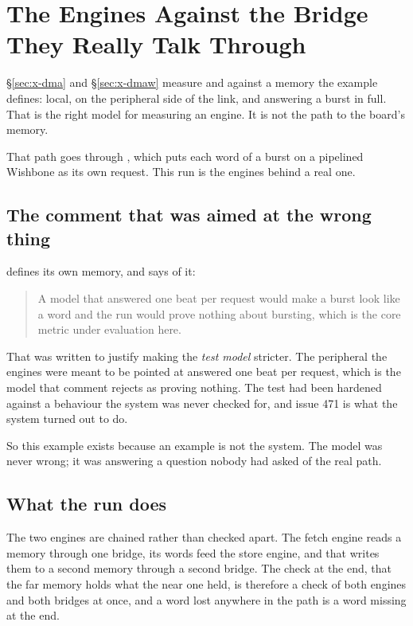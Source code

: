 \section{The Engines Against the Bridge They Really Talk Through}
\label{sec:x-dmawb}

\S\ref{sec:x-dma} and \S\ref{sec:x-dmaw} measure  and
 against a memory the example defines: local, on the
peripheral side of the link, and answering a burst in full. That is
the right model for measuring an engine. It is not the path to the
board's memory.

That path goes through , which puts each word of a burst
on a pipelined Wishbone as its own request. This run is the engines
behind a real one.

\subsection{The comment that was aimed at the wrong thing}

 defines its own memory, and says of it:

\begin{quote}
A model that answered one beat per request would make a burst look
like a word and the run would prove nothing about bursting, which is
the core metric under evaluation here.
\end{quote}

That was written to justify making the \emph{test model} stricter.
The peripheral the engines were meant to be pointed at answered one
beat per request, which is the model that comment rejects as proving
nothing. The test had been hardened against a behaviour the system
was never checked for, and issue 471 is what the system turned out to
do.

So this example exists because an example is not the system. The
model was never wrong; it was answering a question nobody had asked
of the real path.

\subsection{What the run does}

The two engines are chained rather than checked apart. The fetch
engine reads a memory through one bridge, its words feed the store
engine, and that writes them to a second memory through a second
bridge. The check at the end, that the far memory holds what the near
one held, is therefore a check of both engines and both bridges at
once, and a word lost anywhere in the path is a word missing at the
end.

